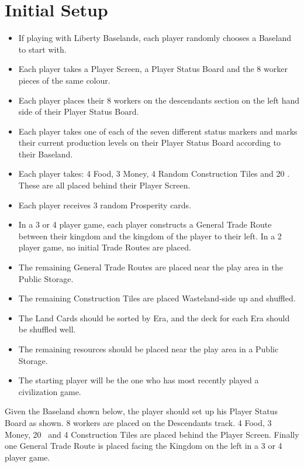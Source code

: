 \documentclass[10pt,twocolumn]{article}
\begin{document}
\section{Initial Setup}
\begin{itemize}
\item If playing with Liberty Baselands, each player randomly chooses a Baseland to start with.
\item Each player takes a Player Screen, a Player Status Board and the 8 worker pieces of the same colour.
\item Each player places their 8 workers on the descendants section on the left hand side of their Player Status Board.
\item Each player takes one of each of the seven different status markers and marks their current production levels on their Player Status Board according to their Baseland.
\item Each player takes: 4 Food, 3 Money, 4 Random Construction Tiles and 20 \vps. These are all placed behind their Player Screen.
\item Each player receives 3 random Prosperity cards.
\item In a 3 or 4 player game, each player constructs a General Trade Route between their kingdom and the kingdom of the player to their left. In a 2 player game, no initial Trade Routes are placed.
\item The remaining General Trade Routes are placed near the play area in the Public Storage.
\item The remaining Construction Tiles are placed Wasteland-side up and shuffled.
\item The Land Cards should be sorted by Era, and the deck for each Era should be shuffled well.
\item The remaining resources should be placed near the play area in a Public Storage.
\item The starting player will be the one who has most recently played a civilization game.
\end{itemize}
\begin{BoxExample}Given the Baseland shown below, the player should set up his Player Status Board as shown. 8 workers are placed on the Descendants track. 4 Food, 3 Money, 20 \vps\ and 4 Construction Tiles are placed behind the Player Screen. Finally one General Trade Route is placed facing the Kingdom on the left in a 3 or 4 player game.\end{BoxExample}
\end{document}
